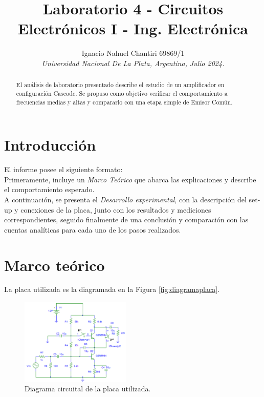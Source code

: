 \documentclass[letterpaper, 10 pt, conference]{ieeeconf}  %
\title{\LARGE \bf
Laboratorio 4 - Circuitos Electrónicos I - Ing. Electrónica
}
\author{Ignacio Nahuel Chantiri 69869/1 \\  %
{\it Universidad Nacional De La Plata, Argentina,}
{\it Julio 2024.}}                              %
\begin{document}
\maketitle
\thispagestyle{empty}
\pagestyle{empty}


\begin{abstract}

El análisis de laboratorio presentado describe el estudio de un amplificador en configuración Cascode. Se propuso como objetivo verificar el comportamiento a frecuencias medias y altas y compararlo con una etapa simple de Emisor Común.
\end{abstract}


\section{Introducci\'on}

El informe posee el siguiente formato:\\
Primeramente, incluye un \textit{Marco Teórico} que abarca las explicaciones y describe el comportamiento esperado.\\ A continuación, se presenta el \textit{Desarrollo experimental}, con la descripción del set-up y conexiones de la placa, junto con los resultados y mediciones correspondientes, seguido finalmente de una conclusión y comparación con las cuentas analíticas para cada uno de los pasos realizados.


\section{Marco teórico}

La placa utilizada es la diagramada en la Figura \autoref{fig:diagramaplaca}.

\begin{figure}[H]
  \centering
  \includegraphics[width=0.47\textwidth]{imagenes/placa.png}
  \caption{Diagrama circuital de la placa utilizada.}
  \label{fig:diagramaplaca}
\end{figure}
\end{document}
